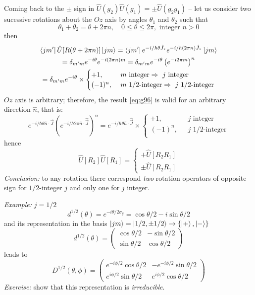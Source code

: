 \documentclass[12pt]{article}
\newcommand{\be}{\begin{equation}}
\newcommand{\ee}{\end{equation}}
\begin{document}
Coming back to the $\pm$ sign in \(\hat{U}\left(g_{2}\right) \hat{U}\left(g_{1}\right)=\pm \hat{U}\left(g_{2} g_{1}\right)\)
-- let us consider two sucessive rotations about the
\(Oz\) axis by angles \(\theta_{1}\) and \(\theta_{2}\) such that
\be
\theta_{1}+\theta_{2}=\theta+2 \pi n, 
\quad 0 \leqslant \theta \leqslant 2 \pi, \text { integer } n>0
\ee
then
\begin{gather}
\begin{gathered}
\bra{jm^\prime}\hat{U}[R(\theta+2\pi n)]\ket{jm}= 
\bra{jm^\prime}
e^{-i/\hbar\theta\hat{J}_z}
e^{-i/\hbar(2\pi n)\hat{J}_z}
\ket{jm}\\
=\delta_{m^{\prime} m} e^{-i \theta} e^{-i(2 \pi n) m}=\delta_{m^{\prime} m} e^{-i \theta}\left(e^{-i 2 \pi m}\right)^{n}
\end{gathered}\\
=\delta_{m^{\prime} m} e^{-i \theta} \times
\begin{cases}
+1,       & \text{ $m$ integer} \Rightarrow \text{ $j$ integer}\\
(-1)^{n}, & \text{ $m$ 1/2-integer} \Rightarrow \text{ $j$ 1/2-integer}\\
\end{cases}
\label{eq:g96}
\end{gather}
$Oz$ axis is arbitrary; therefore, the result \eqref{eq:g96}
is valid for an arbitrary direction $\hat{n}$, that is:
\be
e^{-i/\hbar \theta \hat{n}\cdot\hat{\vec{J}}}
\left(e^{-i/\hbar 2\pi \hat{n}\cdot\hat{\vec{J}}}\right)^n
=
e^{-i/\hbar \theta \hat{n}\cdot\hat{\vec{J}}} \times
\begin{cases}
+1,       & \text{ $j$ integer}\\
(-1)^{n}, & \text{ $j$ 1/2-integer}\\
\end{cases}
\ee
hence
\be
\hat{U}[R_2]\hat{U}[R_1] =
\begin{cases}
+\hat{U}[R_2R_1]\\
\pm\hat{U}[R_2R_1]
\end{cases}
\ee
\emph{Conclusion:} to any rotation there correspond \emph{two}
rotation operators of opposite sign for \(1 / 2\)-integer \(j\)
and only one for \(j\) integer.

\clearpage

\emph{Example:} $j=1/2$
\[
d^{1 / 2}(\theta)=e^{-i \theta / 2 \sigma_{y}}=\cos \theta / 2-i \sin \theta / 2
\]
and its representation in the basis
$\ket{jm} = \ket{1/2,\pm1/2} \to \{\ket{+},\ket{-}\}$
\be
d^{1/2}(\theta) =
\begin{pmatrix}
\cos \theta/2 & -\sin \theta/2 \\
\sin \theta/2 &  \cos \theta/2
\end{pmatrix}
\ee
leads to
\be
D^{1/2}(\theta,\phi) =
\begin{pmatrix}
e^{-i\phi/2}\cos \theta/2 & -e^{-i\phi/2}\sin \theta/2 \\
e^{i\phi/2}\sin \theta/2  &  e^{i\phi/2}\cos \theta/2
\end{pmatrix}
\ee
\emph{Exercise:} show that this representation is \emph{irreducible}.
\end{document}
